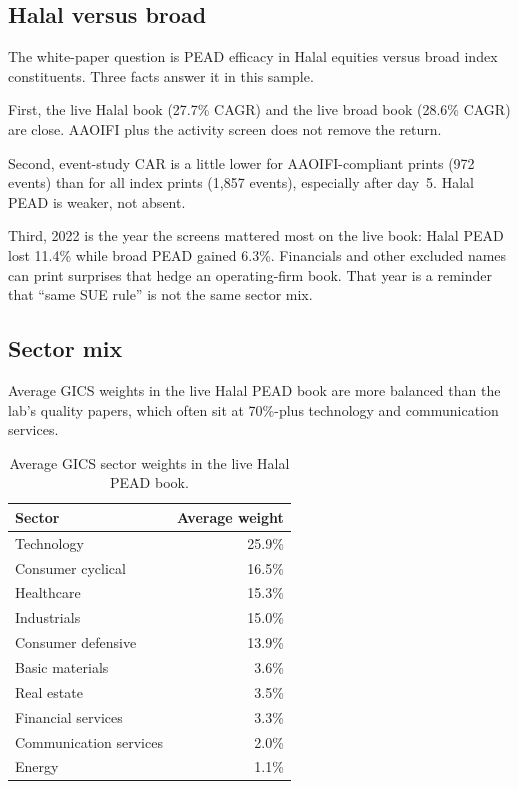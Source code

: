 \documentclass[11pt,letterpaper]{article}
\begin{document}
\subsection{Halal versus broad}

The white-paper question is PEAD efficacy in Halal equities versus broad index constituents. Three facts answer it in this sample.

First, the live Halal book (27.7\% CAGR) and the live broad book (28.6\% CAGR) are close. AAOIFI plus the activity screen does not remove the return.

Second, event-study CAR is a little lower for AAOIFI-compliant prints (972 events) than for all index prints (1{,}857 events), especially after day~5. Halal PEAD is weaker, not absent.

Third, 2022 is the year the screens mattered most on the live book: Halal PEAD lost 11.4\% while broad PEAD gained 6.3\%. Financials and other excluded names can print surprises that hedge an operating-firm book. That year is a reminder that ``same SUE rule'' is not the same sector mix.

\subsection{Sector mix}

Average GICS weights in the live Halal PEAD book are more balanced than the lab's quality papers, which often sit at 70\%-plus technology and communication services.

\begin{table}[htbp]
\centering
\caption{Average GICS sector weights in the live Halal PEAD book.}
\label{tab:sectors}
\begin{tabular}{lr}
\toprule
Sector & Average weight \\
\midrule
Technology              & 25.9\% \\
Consumer cyclical       & 16.5\% \\
Healthcare              & 15.3\% \\
Industrials             & 15.0\% \\
Consumer defensive      & 13.9\% \\
Basic materials         & 3.6\% \\
Real estate             & 3.5\% \\
Financial services      & 3.3\% \\
Communication services  & 2.0\% \\
Energy                  & 1.1\% \\
\bottomrule
\end{tabular}
\end{table}
\end{document}
